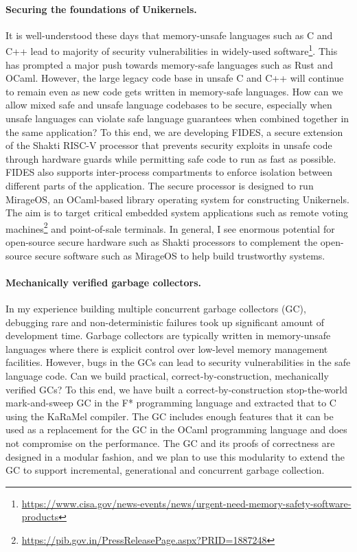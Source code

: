 \documentclass[screen,acmsmall,nonacm]{acmart}
\begin{document}
\paragraph{\bf Securing the foundations of Unikernels.} It is well-understood
these days that memory-unsafe languages such as C and C++ lead to majority of
security vulnerabilities in widely-used
software\footnote{\url{https://www.cisa.gov/news-events/news/urgent-need-memory-safety-software-products}}.
This has prompted a major push towards memory-safe languages such as Rust and
OCaml. However, the large legacy code base in unsafe C and C++ will continue to
remain even as new code gets written in memory-safe languages. How can we allow
mixed safe and unsafe language codebases to be secure, especially when unsafe
languages can violate safe language guarantees when combined together in the
same application? To this end, we are developing FIDES, a secure extension of
the Shakti RISC-V processor that prevents security exploits in unsafe code
through hardware guards while permitting safe code to run as fast as possible.
FIDES also supports inter-process compartments to enforce isolation between
different parts of the application. The secure processor is designed to run
MirageOS, an OCaml-based library operating system for constructing Unikernels.
The aim is to target critical embedded system applications such as remote
voting
machines\footnote{\url{https://pib.gov.in/PressReleasePage.aspx?PRID=1887248}}
and point-of-sale terminals. In general, I see enormous potential for
open-source secure hardware such as Shakti processors to complement the
open-source secure software such as MirageOS to help build trustworthy systems.

\paragraph{\bf Mechanically verified garbage collectors.} In my experience
building multiple concurrent garbage collectors (GC), debugging rare and
non-deterministic failures took up significant amount of development time.
Garbage collectors are typically written in memory-unsafe languages where there
is explicit control over low-level memory management facilities. However, bugs
in the GCs can lead to security vulnerabilities in the safe language code. Can
we build practical, correct-by-construction, mechanically verified GCs? To this
end, we have built a correct-by-construction stop-the-world mark-and-sweep GC
in the F* programming language and extracted that to C using the KaRaMel
compiler. The GC includes enough features that it can be used as a replacement
for the GC in the OCaml programming language and does not compromise on the
performance. The GC and its proofs of correctness are designed in a modular
fashion, and we plan to use this modularity to extend the GC to support
incremental, generational and concurrent garbage collection.
\end{document}
